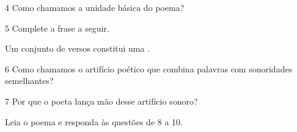 \num{4} Como chamamos a unidade básica do poema?


\num{5} Complete a frase a seguir.

Um conjunto de versos constitui uma .

\num{6} Como chamamos o artifício poético que combina palavras com
sonoridades semelhantes?



\num{7} Por que o poeta lança mão desse artifício sonoro?


\pagebreak
Leia o poema e responda às questões de 8 a 10.

